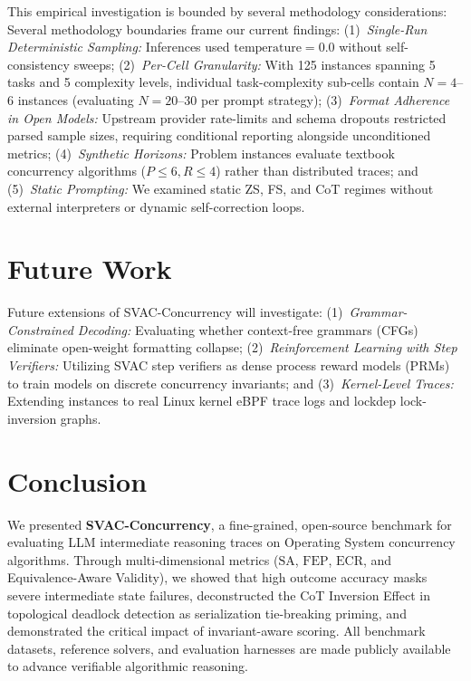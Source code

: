 \documentclass[conference]{IEEEtran}
\newcommand{\SA}{\text{SA}}
\newcommand{\FEP}{\text{FEP}}
\newcommand{\ECR}{\text{ECR}}
\begin{document}
This empirical investigation is bounded by several methodology considerations:
Several methodology boundaries frame our current findings:
(1)~\emph{Single-Run Deterministic Sampling:} Inferences used $\text{temperature} = 0.0$ without self-consistency sweeps;
(2)~\emph{Per-Cell Granularity:} With 125 instances spanning 5 tasks and 5 complexity levels, individual task-complexity sub-cells contain $N = 4$--$6$ instances (evaluating $N = 20$--$30$ per prompt strategy);
(3)~\emph{Format Adherence in Open Models:} Upstream provider rate-limits and schema dropouts restricted parsed sample sizes, requiring conditional reporting alongside unconditioned metrics;
(4)~\emph{Synthetic Horizons:} Problem instances evaluate textbook concurrency algorithms ($P \le 6, R \le 4$) rather than distributed traces; and
(5)~\emph{Static Prompting:} We examined static ZS, FS, and CoT regimes without external interpreters or dynamic self-correction loops.

\section{Future Work}
\label{sec:future}

Future extensions of SVAC-Concurrency will investigate:
(1)~\emph{Grammar-Constrained Decoding:} Evaluating whether context-free grammars (CFGs) eliminate open-weight formatting collapse;
(2)~\emph{Reinforcement Learning with Step Verifiers:} Utilizing SVAC step verifiers as dense process reward models (PRMs) to train models on discrete concurrency invariants; and
(3)~\emph{Kernel-Level Traces:} Extending instances to real Linux kernel eBPF trace logs and lockdep lock-inversion graphs.

\section{Conclusion}
\label{sec:conclusion}

We presented \textbf{SVAC-Concurrency}, a fine-grained, open-source benchmark for
evaluating LLM intermediate reasoning traces on Operating System concurrency algorithms.
Through multi-dimensional metrics ($\SA$, $\FEP$, $\ECR$, and Equivalence-Aware
Validity), we showed that high outcome accuracy masks severe intermediate state failures,
deconstructed the CoT Inversion Effect in topological deadlock detection as serialization
tie-breaking priming, and demonstrated the critical impact of invariant-aware scoring.
All benchmark datasets, reference solvers, and evaluation harnesses are made publicly
available to advance verifiable algorithmic reasoning.


\def\IEEEbibitemsep{0pt plus .5pt}

\end{document}
